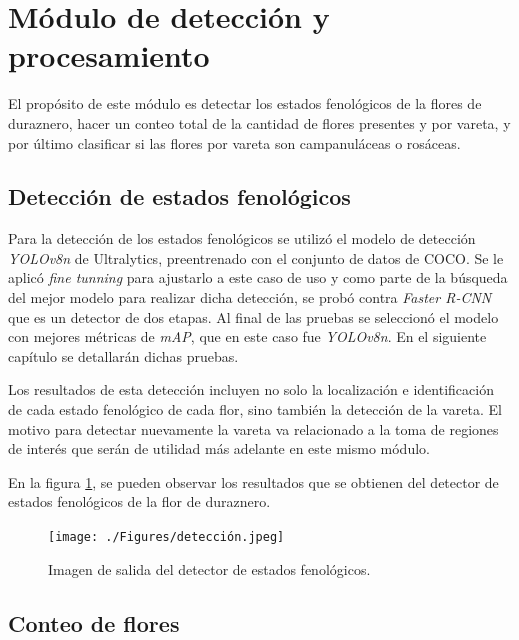 \section{Módulo de detección y procesamiento}

El propósito de este módulo es detectar los estados fenológicos de la flores de duraznero, hacer un conteo total de la cantidad de flores presentes y por vareta, y por último clasificar si las flores por vareta son campanuláceas o rosáceas.

\subsection{Detección de estados fenológicos}

Para la detección de los estados fenológicos se utilizó el modelo de detección \textit{YOLOv8n} de Ultralytics, preentrenado con el conjunto de datos de COCO. Se le aplicó \textit{fine tunning} para ajustarlo a este caso de uso y como parte de la búsqueda del mejor modelo para realizar dicha detección, se probó contra \textit{Faster R-CNN} que es un detector de dos etapas. Al final de las pruebas se seleccionó el modelo con mejores métricas de \textit{mAP}, que en este caso fue \textit{YOLOv8n}. En el siguiente capítulo se detallarán dichas pruebas.

Los resultados de esta detección incluyen no solo la localización e identificación de cada estado fenológico de cada flor, sino también la detección de la vareta. El motivo para detectar nuevamente la vareta va relacionado a la toma de regiones de interés que serán de utilidad más adelante en este mismo módulo.  

En la figura \ref{fig:deteccionEjem}, se pueden observar los resultados que se obtienen del detector de estados fenológicos de la flor de duraznero.

\begin{figure}[ht]
	\centering
	\texttt{[image: ./Figures/detección.jpeg]}
	\caption{Imagen de salida del detector de estados fenológicos.}
	\label{fig:deteccionEjem}
\end{figure}

\subsection{Conteo de flores}



%




